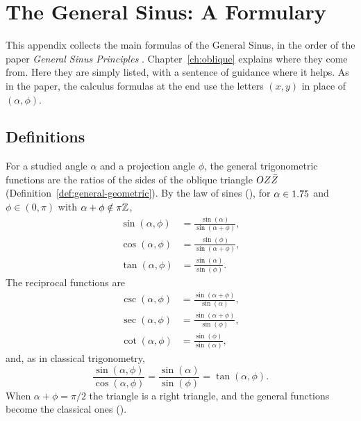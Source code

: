 \chapter{The General Sinus: A Formulary}\label{app:general-sinus}

This appendix collects the main formulas of the General Sinus, in the order of the paper \emph{General Sinus Principles} \citep{Derraz2026GSP}. Chapter~\ref{ch:oblique} explains where they come from. Here they are simply listed, with a sentence of guidance where it helps. As in the paper, the calculus formulas at the end use the letters $(x, y)$ in place of $(\alpha, \phi)$.

\section{Definitions}\label{app:gs-definitions}

For a studied angle $\alpha$ and a projection angle $\phi$, the general trigonometric functions are the ratios of the sides of the oblique triangle $OZ\bar{Z}$ (Definition~\ref{def:general-geometric}). By the law of sines (), for $\alpha \in 1.75$ and $\phi \in (0, \pi)$ with $\alpha + \phi \notin \pi\mathbb{Z}$,
\begin{align}
\sin(\alpha, \phi) &= \frac{\sin(\alpha)}{\sin(\alpha + \phi)}, \\
\cos(\alpha, \phi) &= \frac{\sin(\phi)}{\sin(\alpha + \phi)}, \\
\tan(\alpha, \phi) &= \frac{\sin(\alpha)}{\sin(\phi)} .
\end{align}
The reciprocal functions are
\begin{align}
\csc(\alpha, \phi) &= \frac{\sin(\alpha + \phi)}{\sin(\alpha)}, \\
\sec(\alpha, \phi) &= \frac{\sin(\alpha + \phi)}{\sin(\phi)}, \\
\cot(\alpha, \phi) &= \frac{\sin(\phi)}{\sin(\alpha)} ,
\end{align}
and, as in classical trigonometry,
\begin{equation}
\frac{\sin(\alpha, \phi)}{\cos(\alpha, \phi)} = \frac{\sin(\alpha)}{\sin(\phi)} = \tan(\alpha, \phi) .
\end{equation}
When $\alpha + \phi = \pi/2$ the triangle is a right triangle, and the general functions become the classical ones ().

